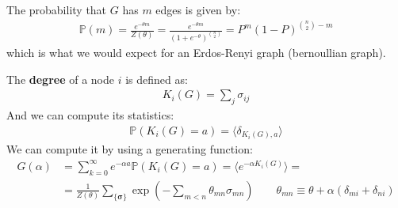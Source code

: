 \documentclass[../../main.tex]{subfiles}
\begin{document}
\begin{exo}
    The probability that $G$ has $m$ edges is given by:
    \begin{align*}
        \mathbb{P}(m) = \frac{e^{-\theta m}}{Z(\theta)} = \frac{e^{-\theta m}}{(1 + e^{-\theta})^{{n\choose 2}}} = P^m (1-P)^{{n\choose 2} - m}
    \end{align*}%
    which is what we would expect for an Erdos-Renyi graph (bernoullian graph). %

    \medskip

    The \textbf{degree} of a node $i$ is defined as:
    \begin{align*}
        K_i(G) = \sum_{j} \sigma_{ij}
    \end{align*} 
    And we can compute its statistics:
    \begin{align*}
        \mathbb{P}(K_i(G) = a) = \langle \delta_{K_i(G),a} \rangle
    \end{align*}
    We can compute it by using a generating function:
    \begin{align*}
        G(\alpha) &= \sum_{k=0}^\infty e^{-\alpha a} \mathbb{P}(K_i(G) = a) = \langle e^{-\alpha K_i(G)} \rangle =\\
        &=\frac{1}{Z(\theta)} \sum_{\{\bm{\sigma}\}} \exp\left(-\sum_{m < n} \theta_{mn} \sigma_{mn}\right) \qquad \theta_{mn} \equiv \theta + \alpha (\delta_{mi} + \delta_{ni})
    \end{align*}


\end{exo}
\end{document}

